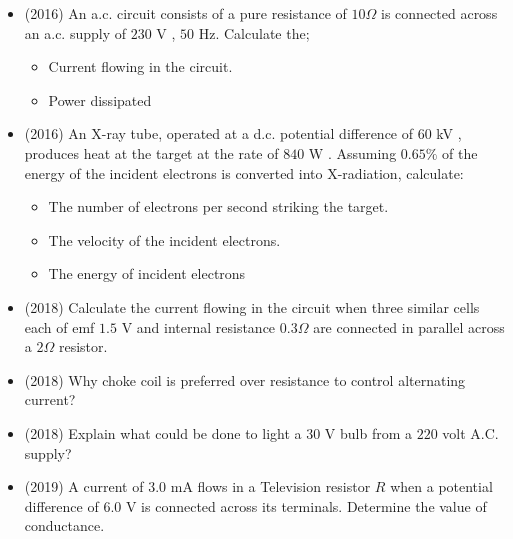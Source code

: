 \documentclass{article}
\begin{document}
\begin{itemize}
\item (2016)  An a.c. circuit consists of a pure resistance of $ 10\Omega $ is connected across an a.c. supply of $ 230$ V , $ 50$ Hz.  Calculate the;
 \begin{itemize}
\item Current flowing in the circuit.
\item Power dissipated
\end{itemize}
\item (2016)  An X-ray tube, operated at a d.c. potential difference of $ 60$ kV , produces heat at the target at the rate of $ 840$ W .  Assuming $ 0.65\%$ of the energy of the incident electrons is converted into X-radiation, calculate:
 \begin{itemize}
\item The number of electrons per second striking the target.
\item The velocity of the incident electrons.
\item The energy of incident electrons
\end{itemize}
\item (2018)  Calculate the current flowing in the circuit when three similar cells each of emf $ 1.5$ V and internal resistance $ 0.3\Omega $ are connected in parallel across a $ 2\Omega $ resistor. 
\item (2018)  Why choke coil is preferred over resistance to control alternating current?
\item (2018)  Explain what could be done to light a $ 30$ V bulb from a $ 220$ volt A.C. supply?
\item (2019)  A current of $ 3.0$ mA flows in a Television resistor $ R$ when a potential difference of $ 6.0$ V is connected across its terminals. Determine the value of conductance.
\end{itemize}
\end{document}

